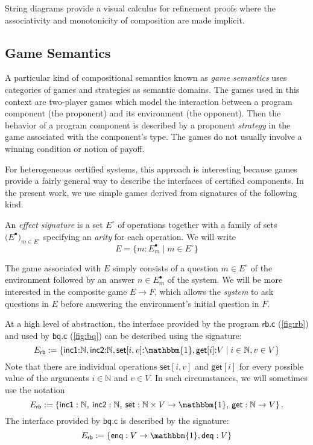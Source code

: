 \documentclass[sigplan,10pt,review,anonymous]{acmart}
\newcommand{\kw}[1]{\ensuremath{ \mathsf{#1} }}
\newcommand{\que}{{\circ}}
\newcommand{\ans}{{\bullet}}
\begin{document}
String diagrams
provide a visual calculus for refinement proofs where
the associativity and monotonicity of composition
are made implicit.


\subsection{Game Semantics} %

A particular kind of compositional semantics
known as \emph{game semantics} uses
categories of games and strategies
as semantic domains.
The games used in this context are
two-player games
which model the interaction between
a program component (the proponent)
and its environment (the opponent).
Then the behavior of a program component
is described by a proponent \emph{strategy}
in the game associated with the component's type.
The games do not usually involve
a winning condition or notion of payoff.

For heterogeneous certified systems,
this approach is interesting
because games provide a fairly general way to describe
the interfaces of certified components.
In the present work,
we use simple games
derived from signatures of the following kind.

\begin{definition}
An \emph{effect signature} is a set $E^\que$ of operations
together with a family of sets $\big( E^\ans \big)_{m \in E^\que}$
specifying an \emph{arity} for each operation.
We will write
\[
  E = \{ m : E^\ans_m \mid m \in E^\que \}
\]
\end{definition}

The game associated with $E$ simply consists of
a question $m \in E^\que$ of the environment
followed by an answer $n \in E^\ans_m$ of the system.
We will be more interested in the composite game $E \rightarrow F$,
which allows the \emph{system} to ask questions in $E$
before answering the environment's initial question in $F$.

At a high level of abstraction,
the interface provided by the program $\kw{rb.c}$ (\autoref{fig:rb})
and used by $\kw{bq.c}$ (\autoref{fig:bq})
can be described using the signature:
\[
  E_\kw{rb} := \{
    \kw{inc1} {:} \mathbb{N},
    \kw{inc2} {:} \mathbb{N},
    \kw{set}[i, v] {:} \mathbbm{1},
    \kw{get}[i] {:} V \mid
    i \in \mathbb{N}, v \in V \}
\]
Note that there are individual operations
$\kw{set}[i, v]$ and $\kw{get}[i]$
for every possible value of the arguments
$i \in \mathbb{N}$ and $v \in V$.
In such circumstances,
we will sometimes use the notation
\[
  E_\kw{rb} := \{
    \kw{inc1} : \mathbb{N}, \:
    \kw{inc2} : \mathbb{N}, \:
    \kw{set} : \mathbb{N} \times V \rightarrow \mathbbm{1}, \:
    \kw{get} : \mathbb{N} \rightarrow V \}
  \,.
\]
The interface provided by $\kw{bq.c}$
is described by the signature:
\[
  E_\kw{rb} := \{
    \kw{enq} : V \rightarrow \mathbbm{1},
    \kw{deq} : V \}
\]
\end{document}

